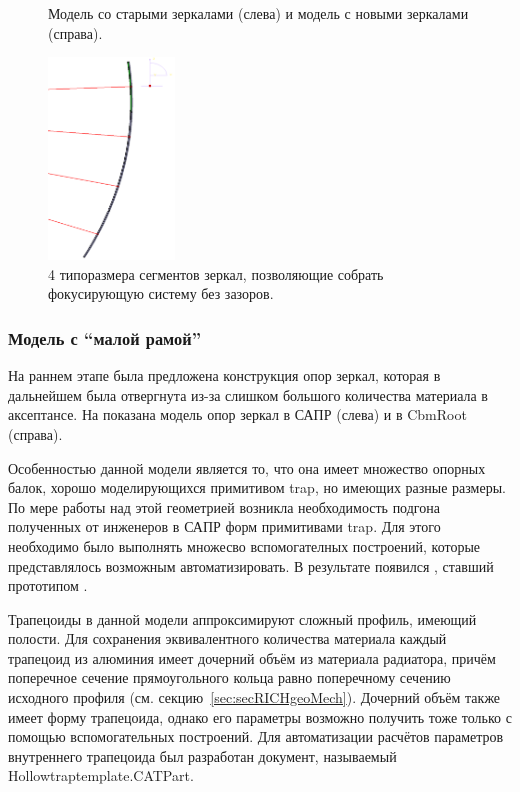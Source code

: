 \begin{figure}[H]
\begin{minipage}[b]{0.49\textwidth}
\end{minipage}
\caption{Модель со старыми зеркалами (слева) и модель с новыми зеркалами (справа).}
\label{fig:MCgeoMirrorsEvolution}
\end{figure}

\begin{figure}[H]
\centering
\includegraphics[width=0.3\textwidth]{pictures/Mirrors_4types_of_segments.png}
\caption{4 типоразмера сегментов зеркал, позволяющие собрать фокусирующую систему без зазоров.}
\label{fig:Mirrors4types}
\end{figure}

\subsubsection{Модель с ``малой рамой''}\label{sec:secModelWithSmallFrame}

На раннем этапе была предложена конструкция опор зеркал, которая в дальнейшем была отвергнута из-за слишком большого количества материала в аксептансе. На  показана модель опор зеркал в САПР (слева) и в CbmRoot (справа).

Особенностью данной модели является то, что она имеет множество опорных балок, хорошо моделирующихся примитивом trap, но имеющих разные размеры.
По мере работы над этой геометрией возникла необходимость подгона полученных от инженеров в САПР форм примитивами trap.
Для этого необходимо было выполнять множесво вспомогателных построений, которые представлялось возможным автоматизировать.
В результате появился , ставший прототипом .

Трапецоиды в данной модели аппроксимируют сложный профиль, имеющий полости. Для сохранения эквивалентного количества материала каждый трапецоид из алюминия имеет дочерний объём из материала радиатора, причём поперечное сечение прямоугольного кольца равно поперечному сечению исходного профиля (см. секцию~\ref{sec:secRICHgeoMech}). Дочерний объём также имеет форму трапецоида, однако его параметры возможно получить тоже только с помощью вспомогательных построений. Для автоматизации расчётов параметров внутреннего трапецоида был разработан документ, называемый Hollow\textunderscore trap\textunderscore template.CATPart.

